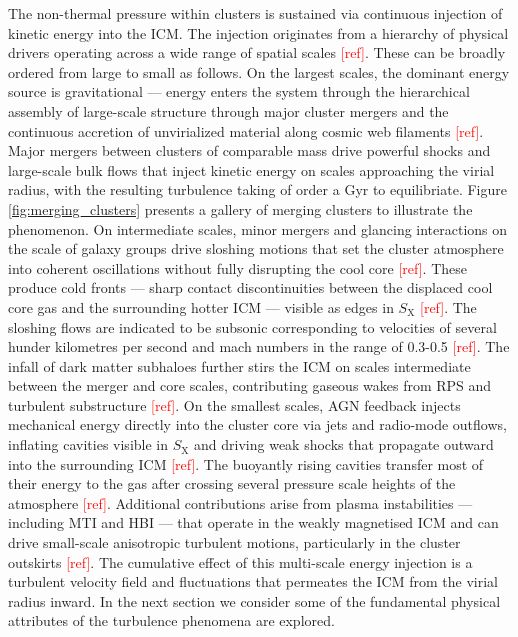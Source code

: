 The non-thermal pressure within clusters is sustained via continuous injection of kinetic energy into the ICM. The injection originates from a hierarchy of physical drivers operating across a wide range of spatial scales \textcolor{red}{[ref]}. These can be broadly ordered from large to small as follows.
\pbreak
On the largest scales, the dominant energy source is gravitational — energy enters the system through the hierarchical assembly of large-scale structure through major cluster mergers and the continuous accretion of unvirialized material along cosmic web filaments \textcolor{red}{[ref]}. Major mergers between clusters of comparable mass drive powerful shocks and large-scale bulk flows that inject kinetic energy on scales approaching the virial radius, with the resulting turbulence taking of order a Gyr to equilibriate. Figure \ref{fig:merging_clusters} presents a gallery of merging clusters to illustrate the phenomenon. %
\pbreak
On intermediate scales, minor mergers and glancing interactions on the scale of galaxy groups drive sloshing motions that set the cluster atmosphere into coherent oscillations without fully disrupting the cool core \textcolor{red}{[ref]}. These produce cold fronts — sharp contact discontinuities between the displaced cool core gas and the surrounding hotter ICM — visible as edges in $S_{\mathrm{X}}$ \textcolor{red}{[ref]}. The sloshing flows are indicated to be subsonic corresponding to velocities of several hunder kilometres per second and mach numbers in the range of 0.3-0.5 \textcolor{red}{[ref]}. The infall of dark matter subhaloes further stirs the ICM on scales intermediate between the merger and core scales, contributing gaseous wakes from RPS and turbulent substructure \textcolor{red}{[ref]}.
\pbreak
On the smallest scales, AGN feedback injects mechanical energy directly into the cluster core via jets and radio-mode outflows, inflating cavities visible in $S_{\mathrm{X}}$ and driving weak shocks that propagate outward into the surrounding ICM \textcolor{red}{[ref]}. The buoyantly rising cavities transfer most of their energy to the gas after crossing several pressure scale heights of the atmosphere \textcolor{red}{[ref]}. Additional contributions arise from plasma instabilities — including MTI and HBI — that operate in the weakly magnetised ICM and can drive small-scale anisotropic turbulent motions, particularly in the cluster outskirts \textcolor{red}{[ref]}.
\pbreak
The cumulative effect of this multi-scale energy injection is a turbulent velocity field and fluctuations that permeates the ICM from the virial radius inward. In the next section we consider some of the fundamental physical attributes of the turbulence phenomena are explored.  


